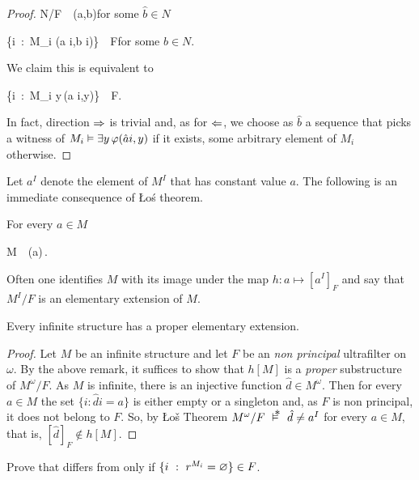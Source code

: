\documentclass[creche.tex]{subfiles}
\begin{document}
\begin{proof}
%
{\IFF}%
{N/F\ \pmodels\  \phi\big(\hat a,\hat b\big)}\hfill for some $\hat b\in N$\phantom{.}

\ceq{}{\IFF}%
{\big\{i\ :\ M_i\; \models\; \phi(\hat a i,\hat b i)\;\big\}\ \in\ F}\hfill for some $\hat b\in N$.

We claim this is equivalent to

\ceq{}{\IFF}%
{\big\{i\ :\ M_i\; \models\; \E y\,\phi(\hat a i,y)\;\big\}\ \in\ F.}

In fact, direction $\Rightarrow$ is trivial and, as for $\Leftarrow$, we choose as $\hat b$ a sequence that picks a witness of $M_i\vDash\exists y\,\varphi(\hat a i,y)$ if it exists, some arbitrary element of $M_i$ otherwise.
\end{proof}

Let \emph{$a^I$\/} denote the element of $M^I$ that has constant value $a$. The following is an immediate consequence of \L o\'{s} theorem.

\begin{corollary}\label{ultrapotenzeelementari}
For every $a\in M$

%
{\IFF}%
{M\ \models\ \phi(a)\,.}\QED
\end{corollary}


Often one identifies $M$ with its image under the map $h:a\mapsto [a^I]_F$ and say that $M^I/F$ is an elementary extension of $M$.

\begin{corollary}
Every infinite structure has a proper elementary extension.
\end{corollary}

\begin{proof}
Let $M$ be an infinite structure and let $F$ be an \textit{non principal\/} ultrafilter on $\omega$. By the above remark, it suffices to show that $h[M]$ is a \textit{proper\/} substructure of $M^\omega/F$.  As $M$ is infinite, there is an injective function  $\hat d\in M^\omega$. Then for every $a\in M$ the set $\big\{i:\hat di=a\big\}$ is either empty or a singleton and, as $F$ is non principal, it does not belong to $F$. So, by \L o\v{s} Theorem $M^\omega/F\ \pmodels\ \hat d\neq a^I$ for every $a\in M$, that is, $[\hat d]_F\notin h[M]$.
\end{proof}

\begin{exercise}\label{ex_c3=c3'}
Prove that  differs from  only if $\{ i\ :\ r^{M_i}=\varnothing\}\in F$. 
\end{exercise}
\end{document}
